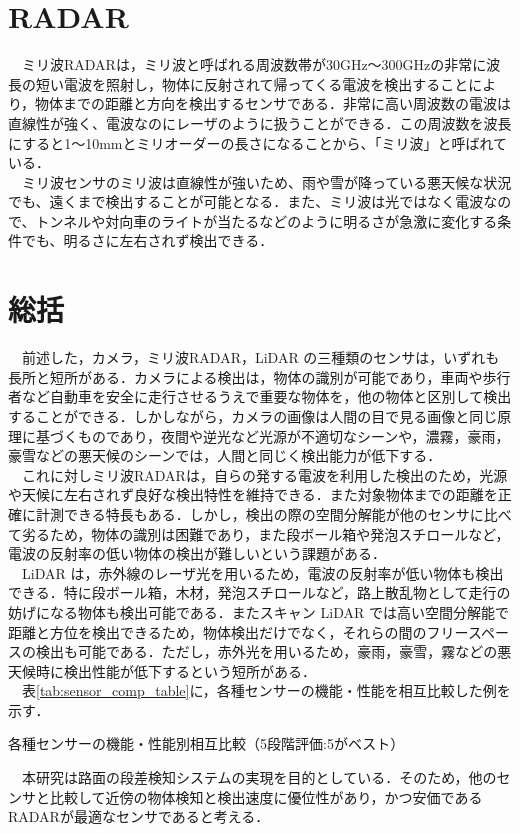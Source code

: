 \section{RADAR}
　ミリ波RADARは，ミリ波と呼ばれる周波数帯が30GHz～300GHzの非常に波長の短い電波を照射し，物体に反射されて帰ってくる電波を検出することにより，物体までの距離と方向を検出するセンサである．非常に高い周波数の電波は直線性が強く、電波なのにレーザのように扱うことができる．この周波数を波長にすると1～10mmとミリオーダーの長さになることから、「ミリ波」と呼ばれている．\\
　ミリ波センサのミリ波は直線性が強いため、雨や雪が降っている悪天候な状況でも、遠くまで検出することが可能となる．また、ミリ波は光ではなく電波なので、トンネルや対向車のライトが当たるなどのように明るさが急激に変化する条件でも、明るさに左右されず検出できる．\cite{zmp_sensor}

\section{総括}
　前述した，カメラ，ミリ波RADAR，LiDAR の三種類のセンサは，いずれも長所と短所がある．カメラによる検出は，物体の識別が可能であり，車両や歩行者など自動車を安全に走行させるうえで重要な物体を，他の物体と区別して検出することができる．しかしながら，カメラの画像は人間の目で見る画像と同じ原理に基づくものであり，夜間や逆光など光源が不適切なシーンや，濃霧，豪雨，豪雪などの悪天候のシーンでは，人間と同じく検出能力が低下する．\\
　これに対しミリ波RADARは，自らの発する電波を利用した検出のため，光源や天候に左右されず良好な検出特性を維持できる．また対象物体までの距離を正確に計測できる特長もある．しかし，検出の際の空間分解能が他のセンサに比べて劣るため，物体の識別は困難であり，また段ボール箱や発泡スチロールなど，電波の反射率の低い物体の検出が難しいという課題がある．\\
　LiDAR は，赤外線のレーザ光を用いるため，電波の反射率が低い物体も検出できる．特に段ボール箱，木材，発泡スチロールなど，路上散乱物として走行の妨げになる物体も検出可能である．またスキャン LiDAR では高い空間分解能で距離と方位を検出できるため，物体検出だけでなく，それらの間のフリースペースの検出も可能である．ただし，赤外光を用いるため，豪雨，豪雪，霧などの悪天候時に検出性能が低下するという短所がある．\\

　表\ref{tab:sensor_comp_table}に，各種センサーの機能・性能を相互比較した例を示す．\cite{cleantechnica_sensor}

\begin{table}[H]
    \centering
    \caption{各種センサーの機能・性能別相互比較（5段階評価:5がベスト）\cite{cleantechnica_sensor}}
    
    \label{tab:sensor_comp_table}
\end{table}

　本研究は路面の段差検知システムの実現を目的としている．そのため，他のセンサと比較して近傍の物体検知と検出速度に優位性があり，かつ安価であるRADARが最適なセンサであると考える．
